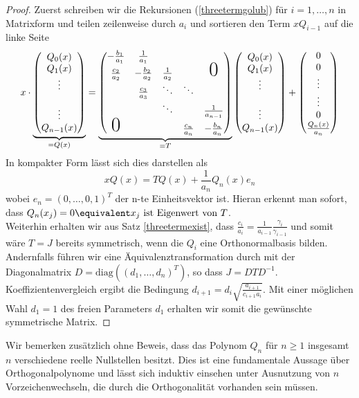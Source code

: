 \begin{proof}
Zuerst schreiben wir die Rekursionen (\ref{threetermgolub}) für $i=1,\dots,n$ in Matrixform und teilen zeilenweise durch $a_i$ und sortieren den Term $xQ_{i-1}$ auf die linke Seite
\begin{equation*}
x\cdot
\underbrace{\begin{pmatrix}Q_0(x)\\ Q_1(x) \\ \vdots \\ \\ \vdots \\ Q_{n-1}(x)\end{pmatrix}}_{=Q(x)}
=\underbrace{\begin{pmatrix}
-\frac{b_1}{a_1} & \frac{1}{a_1} &  &  &  \\ 
\frac{c_2}{a_2} & -\frac{b_2}{a_2} & \frac{1}{a_2} & & \text{\huge0} \\ 
 & \frac{c_3}{a_3} & \ddots & \ddots &  \\ 
 &  & \ddots & & \frac{1}{a_{n-1}} \\
\text{\huge0} &  &  & \frac{c_n}{a_n} & -\frac{b_n}{a_n}
\end{pmatrix}}_{=T}
\begin{pmatrix}Q_0(x)\\ Q_1(x) \\ \vdots \\ \\ \vdots \\ Q_{n-1}(x)\end{pmatrix} 
+\begin{pmatrix}0 \\ 0 \\ \vdots \\ \vdots \\ 0 \\ \frac{Q_{n}(x)}{a_n}\end{pmatrix} 
\end{equation*}
In kompakter Form lässt sich dies darstellen als
\[xQ(x)=TQ(x)+\frac{1}{a_n}Q_n(x)e_n\]
wobei $e_n=(0,\dots,0,1)^T$ der n-te Einheitsvektor ist. Hieran erkennt man sofort, dass $Q_n(x_j)=0\equivalent x_j\text{ ist Eigenwert von }T$.\\
Weiterhin erhalten wir aus Satz \ref{threetermexist}, dass $\frac{c_i}{a_i}=\frac{1}{a_{i-1}}\frac{\gamma_i}{\gamma_{i-1}}$ und somit wäre $T=J$ bereits symmetrisch, wenn die $Q_i$ eine Orthonormalbasis bilden.\\
Andernfalls führen wir eine Äquivalenztransformation durch mit der Diagonalmatrix $D=\text{diag}\left((d_1,\dots,d_n)^T\right)$, so dass $J=DTD^{-1}$. Koeffizientenvergleich ergibt die Bedingung $d_{i+1}=d_i\sqrt{\frac{a_{i+1}}{c_{i+1}a_i}}$. Mit einer möglichen Wahl $d_1=1$ des freien Parameters $d_1$ erhalten wir somit die gewünschte symmetrische Matrix.
\end{proof}
Wir bemerken zusätzlich ohne Beweis, dass das Polynom $Q_n$ für $n\ge 1$ insgesamt $n$ verschiedene reelle Nullstellen besitzt. Dies ist eine fundamentale Aussage über Orthogonalpolynome und lässt sich induktiv einsehen unter Ausnutzung von $n$ Vorzeichenwechseln, die durch die Orthogonalität vorhanden sein müssen.


